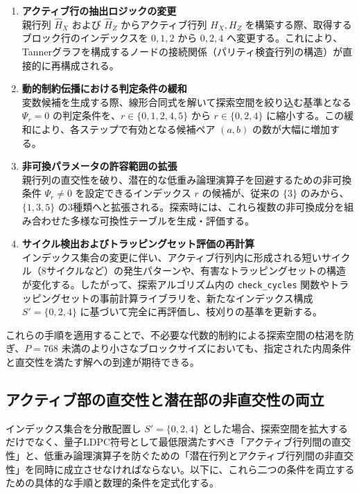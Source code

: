 \documentclass[a4paper,11pt,dvipdfmx]{jsarticle}
\theoremstyle{definition}
\begin{document}
\begin{enumerate}
    \item \textbf{アクティブ行の抽出ロジックの変更}\\
    親行列 $\hat{H}_X$ および $\hat{H}_Z$ からアクティブ行列 $H_X, H_Z$ を構築する際、取得するブロック行のインデックスを $0, 1, 2$ から $0, 2, 4$ へ変更する。これにより、Tannerグラフを構成するノードの接続関係（パリティ検査行列の構造）が直接的に再構成される。
    
    \item \textbf{動的制約伝播における判定条件の緩和}\\
    変数候補を生成する際、線形合同式を解いて探索空間を絞り込む基準となる $\Psi_r = 0$ の判定条件を、$r \in \{0, 1, 2, 4, 5\}$ から $r \in \{0, 2, 4\}$ に縮小する。この緩和により、各ステップで有効となる候補ペア $(a, b)$ の数が大幅に増加する。

    \item \textbf{非可換パラメータの許容範囲の拡張}\\
    親行列の直交性を破り、潜在的な低重み論理演算子を回避するための非可換条件 $\Psi_r \neq 0$ を設定できるインデックス $r$ の候補が、従来の $\{3\}$ のみから、$\{1, 3, 5\}$ の3種類へと拡張される。探索時には、これら複数の非可換成分を組み合わせた多様な可換性テーブルを生成・評価する。

    \item \textbf{サイクル検出およびトラッピングセット評価の再計算}\\
    インデックス集合の変更に伴い、アクティブ行列内に形成される短いサイクル（8サイクルなど）の発生パターンや、有害なトラッピングセットの構造が変化する。したがって、探索アルゴリズム内の \texttt{check\_cycles} 関数やトラッピングセットの事前計算ライブラリを、新たなインデックス構成 $S' = \{0, 2, 4\}$ に基づいて完全に再評価し、枝刈りの基準を更新する。
\end{enumerate}

これらの手順を適用することで、不必要な代数的制約による探索空間の枯渇を防ぎ、$P=768$ 未満のより小さなブロックサイズにおいても、指定された内周条件と直交性を満たす解への到達が期待できる。

\subsection{アクティブ部の直交性と潜在部の非直交性の両立}

インデックス集合を分散配置し $S' = \{0, 2, 4\}$ とした場合、探索空間を拡大するだけでなく、量子LDPC符号として最低限満たすべき「アクティブ行列間の直交性」と、低重み論理演算子を防ぐための「潜在行列とアクティブ行列間の非直交性」を同時に成立させなければならない。以下に、これら二つの条件を両立するための具体的な手順と数理的条件を定式化する。
\end{document}
